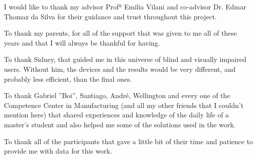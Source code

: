 
I would like to thank my advisor Profª Emilia Vilani and co-advisor Dr. Edmar Thomaz da Silva for their guidance and trust throughout this project.

To thank my parents, for all of the support that was given to me all of these years and that I will always be thankful for having.

To thank Sidney, that guided me in this universe of blind and visually impaired users. Without him, the devices and the results would be very different, and probably less efficient, than the final ones.

To thank Gabriel ”Boi”, Santiago, André, Wellington and every one of the Competence Center in Manufacturing (and all my other friends that I couldn’t mention here) that shared experiences and knowledge of the daily life of a master’s student and also helped me some of the solutions used in the work.

To thank all of the participants that gave a little bit of their time and patience to provide me with data for this work.
